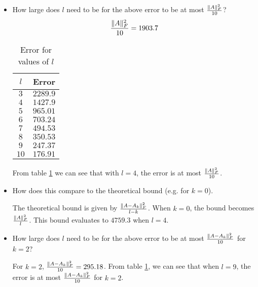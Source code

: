 \documentclass[11pt]{article}
\begin{document}
\begin{itemize}
\item How large does $l$ need to be for the above error to be at most $\frac{\lVert A\rVert_F^2}{10}$?\\
$$
\frac{\lVert A\rVert_F^2}{10} = 1903.7
$$

\begin{table}[!h] 
    \centering
    \caption{Error for values of $l$}
    \label{ErrL}
    \begin{tabular}{|c|c|}
      \hline
   $l$  & Error  \\
      \hline      
      $3$ &      $2289.9$  \\
      \hline
      $4$ &      $1427.9$  \\
      \hline
      $5$ &      $965.01$  \\
      \hline
      $6$ &      $703.24$  \\
      \hline
      $7$ &      $494.53$  \\
      \hline
      $8$ &      $350.53$  \\
      \hline
      $9$ &      $247.37$  \\
      \hline
      $10$ &      $176.91$  \\
      \hline
    \end{tabular}
\end{table}

From table \ref{ErrL} we can see that with $l=4$, the error is at most $\frac{\lVert A\rVert_F^2}{10}$.

\item How does this compare to the theoretical bound (e.g. for $k = 0$).

The theoretical bound is given by $\frac{\lVert A-A_k\rVert_F^2}{l-k}$. When $k=0$, the bound becomes $\frac{\lVert A\rVert_F^2}{l}$. This bound evaluates to $4759.3$ when $l=4$.

\item How large does $l$ need to be for the above error to be at most $\frac{\lVert A-A_k\rVert_F^2}{10}$ for $k = 2$?

For $k = 2$, $\frac{\lVert A-A_k\rVert_F^2}{10} = 295.18$. From table \ref{ErrL}, we can see that when $l=9$, the error is at most $\frac{\lVert A-A_k\rVert_F^2}{10}$ for $k = 2$.

\end{itemize}
\end{document}
